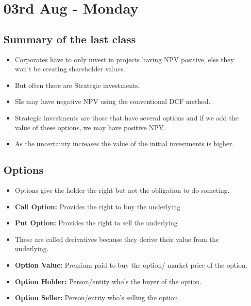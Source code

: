 \documentclass{article}
\begin{document}
\section{03rd Aug - Monday}

\subsection{Summary of the last class}
\begin{itemize}
    \item Corporates have to only invest in projects having NPV positive, else they won't be creating shareholder values.
    \item But often there are Strategic investments.
    \item SIs may have negative NPV using the conventional DCF method.
    \item Strategic investments are those that have several options and if we add the value of these options, we may have positive NPV.
    \item As the uncertainty increases the value of the initial investments is higher.
\end{itemize}

\subsection{Options}
\begin{itemize}
    \item Options give the holder the right but not the obligation to do someting.
    \item \textbf{Call Option:} Provides the right to buy the underlying
    \item \textbf{Put Option:} Provides the right to sell the underlying
    \item These are called derivatives because they derive their value from the underlying.
    \item \textbf{Option Value:} Premium paid to buy the option/ market price of the option.
    \item \textbf{Option Holder:} Person/entity who's the buyer of the option.
    \item \textbf{Option Seller:} Person/entity who's selling the option.
\end{itemize}
\end{document}
